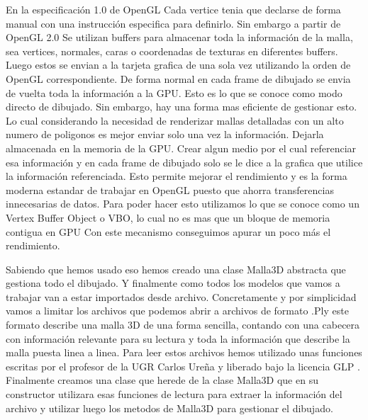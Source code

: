 En la especificación 1.0 de OpenGL Cada vertice tenia que declarse de forma manual con una instrucción especifica para definirlo. Sin embargo a partir de OpenGL 2.0 Se utilizan buffers para almacenar toda la información de la malla, sea vertices, normales, caras o coordenadas de texturas en diferentes buffers. Luego estos se envian a la tarjeta grafica de una sola vez utilizando la orden de OpenGL correspondiente. De forma normal en cada frame de dibujado se envia de vuelta toda la información a la GPU. Esto es lo que se conoce como modo directo de dibujado. Sin embargo, hay una forma mas eficiente de gestionar esto. Lo cual considerando la necesidad de renderizar mallas detalladas con un alto numero de poligonos
es mejor enviar solo una vez la información. Dejarla almacenada en la memoria de la GPU. Crear algun medio por el cual referenciar esa información y en cada frame de dibujado solo se le dice a la grafica que utilice la información referenciada. Esto permite mejorar el rendimiento y es la forma moderna estandar de trabajar en OpenGL puesto que ahorra transferencias innecesarias de datos. Para poder hacer esto utilizamos lo que se conoce como un Vertex Buffer Object o VBO, lo cual no es mas que un bloque de memoria contigua en GPU \cite{khronosVertexSpecification} Con este mecanismo conseguimos apurar un poco más el rendimiento.

Sabiendo que hemos usado eso hemos creado una clase Malla3D abstracta que gestiona todo el dibujado. Y finalmente como todos los modelos que vamos a trabajar van a estar importados desde archivo. Concretamente y por simplicidad vamos a limitar los archivos que podemos abrir a archivos de formato .Ply este formato describe una malla 3D de una forma sencilla, contando con una cabecera con información relevante para su lectura y toda la información que describe la malla puesta linea a linea. Para leer estos archivos hemos utilizado unas funciones escritas por el profesor de la UGR Carlos Ureña y liberado bajo la licencia GLP \cite{gplv3}.
Finalmente creamos una clase que herede de la clase Malla3D que en su constructor utilizara esas funciones de lectura para extraer la información del archivo y utilizar luego los metodos de Malla3D para gestionar el dibujado.

